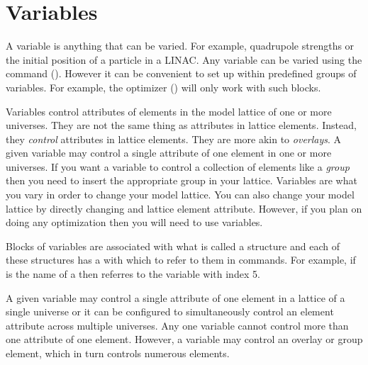\section{Variables}
\label{s:variable-overview}


A variable is anything that can be varied. For example, quadrupole
strengths or the initial position of a particle in a LINAC. Any
variable can be varied using the  command
(). However it can be convenient to set up within \tao
predefined groups of variables. For example, the optimizer
() will only work with such blocks.


Variables control attributes of elements in the model lattice of one
or more universes. They are not the same thing as attributes in
lattice elements.  Instead, they \textit{control} attributes in
lattice elements. They are more akin to \bmad \textit{overlays}. A
given variable may control a single attribute of one element in one or
more universes. If you want a variable to control a collection of
elements like a \bmad \textit{group} then you need to insert the
appropriate group in your lattice. Variables are what you vary in
order to change your model lattice. You can also change your model
lattice by directly changing and lattice element attribute. However,
if you plan on doing any optimization then you will need to use
variables.



Blocks of variables are associated with what is called a 
structure and each of these structures has a  with which to
refer to them in \tao commands. For example, if  is the
name of a  then  referres to the variable 
with index 5. 

A given variable may control a single attribute of one element in a
 lattice of a single universe or it can be configured to
simultaneously control an element attribute across multiple
universes. Any one variable cannot control more than one attribute of
one element. However, a variable may control an overlay or group
element, which in turn controls numerous elements.

